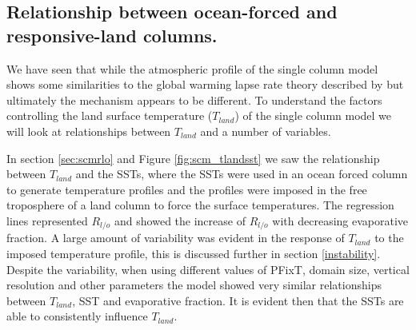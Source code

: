 \subsection{Relationship between ocean-forced and responsive-land columns.}

We have seen that while the atmospheric profile of the single column model shows 
some similarities to the global warming lapse rate theory described by 
\citet{Byrne2013a} but ultimately the mechanism appears to be different.  To 
understand the factors controlling the land surface temperature ($T_{land}$) of 
the single column model we will look at relationships between $T_{land}$ and a 
number of variables. 

In section \ref{sec:scmrlo} and Figure \ref{fig:scm_tlandsst} we saw the 
relationship between $T_{land}$ and the SSTs, where the SSTs were used in an 
ocean forced column to generate temperature profiles and the profiles were imposed in 
the free troposphere of a land column to force the surface temperatures.  The 
regression lines represented $R_{l/o}$ and showed the increase of $R_{l/o}$ with 
decreasing evaporative fraction.  A large amount of variability was evident in 
the response of $T_{land}$ to the imposed temperature profile, this is discussed 
further in section \ref{instability}.  Despite the variability,
when using different values of PFixT, domain size, vertical resolution and other 
parameters the model showed very similar relationships between $T_{land}$, SST 
and evaporative fraction. It is evident then that the SSTs are able to 
consistently influence $T_{land}$.

